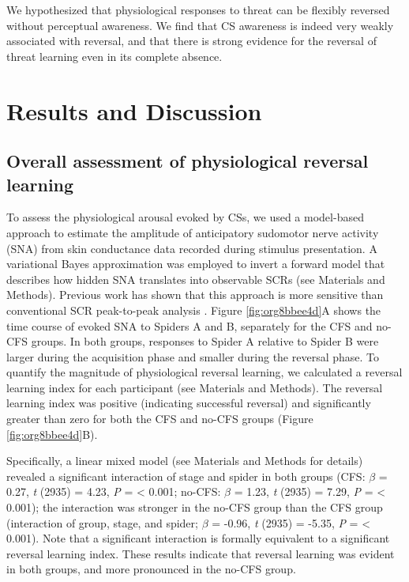 \documentclass[12pt]{article}
\begin{document}
We hypothesized that physiological responses to threat can be flexibly
reversed without perceptual awareness. We find that CS awareness is
indeed very weakly associated with reversal, and that there is strong
evidence for the reversal of threat learning even in its complete
absence.

\section*{Results and Discussion}
\label{sec:org85e499c}
\subsection*{Overall assessment of physiological reversal learning}
\label{sec:orgd4d269a}
To assess the physiological arousal evoked by CSs, we used a model-based
approach \cite{Bach2010} to estimate the amplitude of anticipatory
sudomotor nerve activity (SNA) from skin conductance data recorded
during stimulus presentation. A variational Bayes approximation was
employed to invert a forward model that describes how hidden SNA
translates into observable SCRs (see Materials and Methods). Previous
work has shown that this approach is more sensitive than conventional
SCR peak-to-peak analysis \cite{Bach2010,Bach2014,Staib2015}. Figure
\ref{fig:org8bbee4d}A shows the time course of evoked SNA to Spiders A and B,
separately for the CFS and no-CFS groups. In both groups, responses to
Spider A relative to Spider B were larger during the acquisition phase
and smaller during the reversal phase. To quantify the magnitude of
physiological reversal learning, we calculated a reversal learning index
for each participant (see Materials and Methods). The reversal learning
index was positive (indicating successful reversal) and significantly
greater than zero for both the CFS and no-CFS groups (Figure
\ref{fig:org8bbee4d}B).

Specifically, a linear mixed model (see Materials and Methods for
details) revealed a significant interaction of stage and spider in both
groups (CFS: \(\beta\) = 0.27, \emph{t} (2935) = 4.23, \emph{P} = < 0.001; no-CFS:
\(\beta\) = 1.23, \emph{t} (2935) = 7.29, \emph{P} = < 0.001); the interaction was stronger in the
no-CFS group than the CFS group (interaction of group, stage, and
spider; \(\beta\) = -0.96, \emph{t} (2935) = -5.35, \emph{P} = < 0.001). Note that a significant
interaction is formally equivalent to a significant reversal learning
index. These results indicate that
reversal learning was evident in both groups, and more pronounced in the
no-CFS group.
\end{document}
